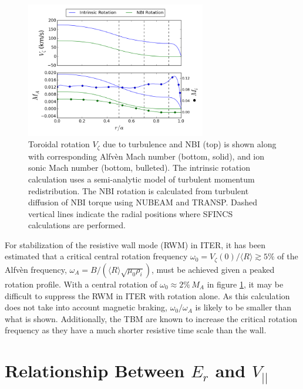 \documentclass[aip, pop, preprint]{revtex4-1}
\numberwithin{figure}{section}
\numberwithin{equation}{section}
\begin{document}
\begin{figure}[h!]
\centering
\includegraphics[width=0.7\textwidth]{rotationestimate.png}
\caption{\label{fig:rotation_estimate} Toroidal rotation $V_{\zeta}$ due to turbulence and NBI (top) is shown along with  corresponding Alfv\`{e}n Mach number (bottom, solid), and ion sonic Mach number (bottom, bulleted). The intrinsic rotation calculation uses a semi-analytic model of turbulent momentum redistribution.\cite{Hillesheim2015} The NBI rotation is calculated from turbulent diffusion of NBI torque using NUBEAM and TRANSP.\cite{Poli2014} Dashed vertical lines indicate the radial positions where SFINCS calculations are performed. }
\end{figure}

For stabilization of the resistive wall mode (RWM) in ITER, it has been estimated that a critical central rotation frequency $\omega_0 = V_{\zeta}(0)/\langle R \rangle \gtrsim 5\%$ of the Alfv\`{e}n frequency, $\omega_A = B/(\langle R\rangle\sqrt{\mu_0 \rho_i})$, must be achieved given a peaked rotation profile.\cite{Liu2004} With a central rotation of $\omega_0 \approx 2\% \, M_A$ in figure \ref{fig:rotation_estimate}, it may be difficult to suppress the RWM in ITER with rotation alone. As this calculation does not take into account magnetic braking, $\omega_0/\omega_A$ is likely to be smaller than what is shown. Additionally, the TBM are known to increase the critical rotation frequency as they have a much shorter resistive time scale than the wall.\cite{Liu2004}

\FloatBarrier

\section{Relationship Between $E_r$ and $V_{||}$}\label{Erandv}
\end{document}

